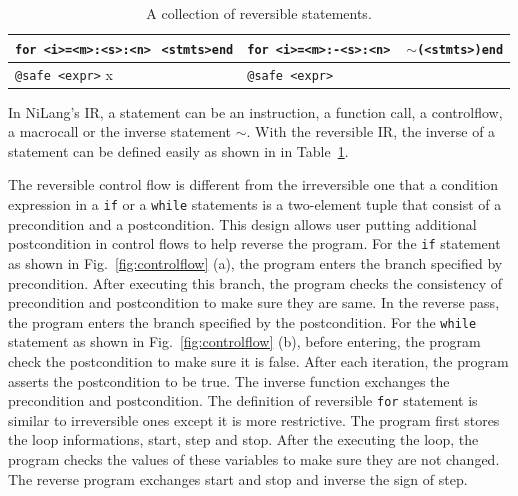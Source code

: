 \documentclass[aps,twocolumn,longbibliography,english,superscriptaddress]{revtex4-1}
\newcommand{\<}{\langle}
\renewcommand{\>}{\rangle}
\newcommand{\cquad}{{{ }_{\quad}}}
\newcommand{\Fig}[1]{Fig.~\ref{#1}}
\newcommand{\Tbl}[1]{Table~\ref{#1}}
\newcommand{\App}[1]{Appendix \ref{#1}}
\theoremstyle{definition}\newtheorem{definition}{\textit{Definition}}
\begin{document}
\begin{table}[h!]
\begin{minipage}{\columnwidth}
{\begin{tabularx}{\textwidth}{X X}
            \hline
            \texttt{for <i>=<m>:<s>:<n>}\newline $\cquad$\texttt{<stmts>}\newline \texttt{end} & \texttt{for <i>=<m>:-<s>:<n>}\newline $\cquad$ \texttt{$\sim$(<stmts>)}\newline \texttt{end}\\
            \hline
            \texttt{@safe <expr>} x & \texttt{@safe <expr>}\\
            \bottomrule
        \end{tabularx}
    }
    \caption{A collection of reversible statements.}\label{tbl:revstatements}
\end{minipage}
\end{table}

In NiLang's IR, a statement can be an instruction, a function call, a controlflow, a macrocall or the inverse statement $\sim$.
With the reversible IR, the inverse of a statement can be defined easily as shown in  in \Tbl{tbl:revstatements}.

The reversible control flow is different from the irreversible one that a condition expression in a \texttt{if} or a \texttt{while} statements is a two-element tuple that consist of a precondition and a postcondition. This design allows user putting additional postcondition in control flows to help reverse the program.
For the \texttt{if} statement as shown in \Fig{fig:controlflow} (a), the program enters the branch specified by precondition. After executing this branch, the program checks the consistency of precondition and postcondition to make sure they are same. In the reverse pass, the program enters the branch specified by the postcondition.
For the \texttt{while} statement as shown in \Fig{fig:controlflow} (b), before entering, the program check the postcondition to make sure it is false.
After each iteration, the program asserts the postcondition to be true. The inverse function exchanges the precondition and postcondition.
The definition of reversible \texttt{for} statement is similar to irreversible ones except it is more restrictive.
The program first stores the loop informations, start, step and stop. After the executing the loop, the program checks the values of these variables to make sure they are not changed. The reverse program exchanges start and stop and inverse the sign of step.
\end{document}
